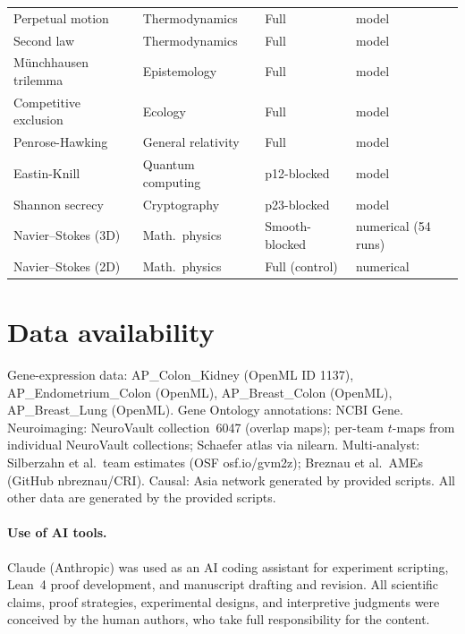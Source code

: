 \documentclass[11pt]{article}
\begin{document}
\begin{table}[h]
\begin{tabular}{@{}llll@{}}
Perpetual motion & Thermodynamics & Full & model \\
Second law & Thermodynamics & Full & model \\
M\"unchhausen trilemma & Epistemology & Full & model \\
Competitive exclusion & Ecology & Full & model \\
Penrose-Hawking & General relativity & Full & model \\
\midrule
Eastin-Knill & Quantum computing & p12-blocked & model \\
Shannon secrecy & Cryptography & p23-blocked & model \\
\midrule
Navier--Stokes (3D) & Math.\ physics & Smooth-blocked & numerical (54 runs) \\
Navier--Stokes (2D) & Math.\ physics & Full (control) & numerical \\
\bottomrule
\end{tabular}
\end{table}


\section*{Data availability}
Gene-expression data: AP\_Colon\_Kidney (OpenML ID 1137),
AP\_Endometrium\_Colon (OpenML), AP\_Breast\_Colon (OpenML),
AP\_Breast\_Lung (OpenML).  Gene Ontology annotations: NCBI Gene.
Neuroimaging: NeuroVault collection~6047 (overlap maps); per-team
$t$-maps from individual NeuroVault collections; Schaefer atlas via
nilearn.  Multi-analyst: Silberzahn et al.\ team estimates (OSF
osf.io/gvm2z); Breznau et al.\ AMEs (GitHub nbreznau/CRI).
Causal: Asia network generated by provided scripts.
All other data are generated by the provided scripts.

\paragraph{Use of AI tools.}
Claude (Anthropic) was used as an AI coding assistant for experiment
scripting, Lean~4 proof development, and manuscript drafting and
revision.  All scientific claims, proof strategies, experimental
designs, and interpretive judgments were conceived by the human
authors, who take full responsibility for the content.
\end{document}

